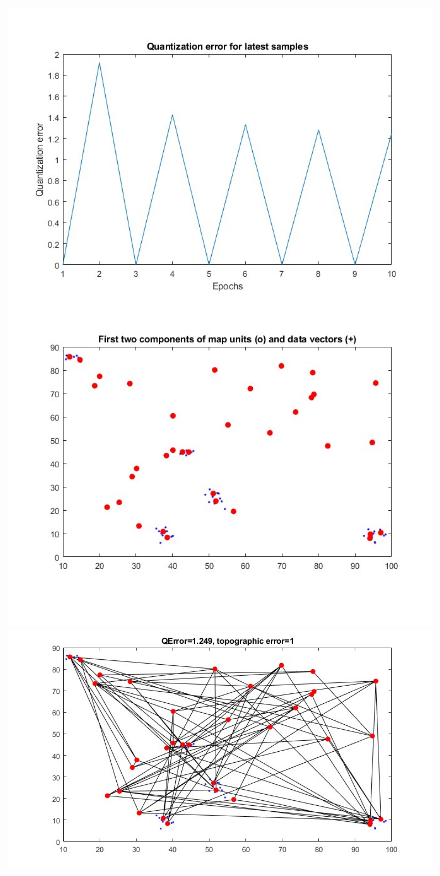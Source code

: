 \documentclass[11pt]{article}
\begin{document}
\begin{figure}[h!]
  \includegraphics{screeny/CWTA/CWTA_5_groups/CWTA_learning_process.jpg}
  \includegraphics{screeny/CWTA/CWTA_5_groups/CWTA_Graph.jpg}

\end{figure}
\end{document}
